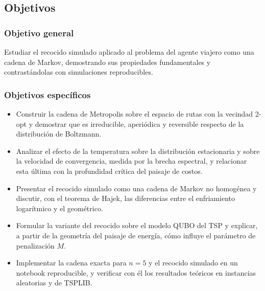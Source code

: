 \subsection{Objetivos}
\label{subsec:objetivos}

\subsubsection*{Objetivo general}

Estudiar el recocido simulado aplicado al problema del agente viajero
como una cadena de Markov, demostrando sus propiedades fundamentales y
contrastándolas con simulaciones reproducibles.

\subsubsection*{Objetivos específicos}

\begin{itemize}
    \item Construir la cadena de Metropolis sobre el espacio de rutas con
    la vecindad 2-opt y demostrar que es irreducible, aperiódica y
    reversible respecto de la distribución de Boltzmann.
    \item Analizar el efecto de la temperatura sobre la distribución
    estacionaria y sobre la velocidad de convergencia, medida por la
    brecha espectral, y relacionar esta última con la profundidad
    crítica del paisaje de costos.
    \item Presentar el recocido simulado como una cadena de Markov no
    homogénea y discutir, con el teorema de Hajek, las diferencias entre
    el enfriamiento logarítmico y el geométrico.
    \item Formular la variante del recocido sobre el modelo QUBO del TSP
    y explicar, a partir de la geometría del paisaje de energía, cómo
    influye el parámetro de penalización \(M\).
    \item Implementar la cadena exacta para \(n=5\) y el recocido
    simulado en un notebook reproducible, y verificar con él los
    resultados teóricos en instancias aleatorias y de TSPLIB.
\end{itemize}
